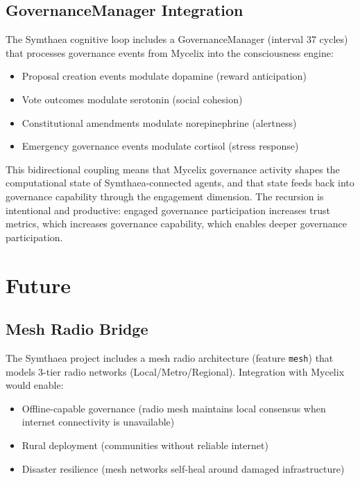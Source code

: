 \documentclass[12pt]{book}
\begin{document}
\section{GovernanceManager Integration}

The Symthaea cognitive loop includes a GovernanceManager (interval 37 cycles)
that processes governance events from Mycelix into the consciousness engine:

\begin{itemize}
  \item Proposal creation events modulate dopamine (reward anticipation)
  \item Vote outcomes modulate serotonin (social cohesion)
  \item Constitutional amendments modulate norepinephrine (alertness)
  \item Emergency governance events modulate cortisol (stress response)
\end{itemize}

This bidirectional coupling means that Mycelix governance activity shapes
the computational state of Symthaea-connected agents, and that state feeds
back into governance capability through the engagement dimension. The
recursion is intentional and productive: engaged governance participation
increases trust metrics, which increases governance capability, which
enables deeper governance participation.


\chapter{Future}

\section{Mesh Radio Bridge}

The Symthaea project includes a mesh radio architecture (feature \texttt{mesh})
that models 3-tier radio networks (Local/Metro/Regional). Integration with
Mycelix would enable:

\begin{itemize}
  \item Offline-capable governance (radio mesh maintains local consensus when
    internet connectivity is unavailable)
  \item Rural deployment (communities without reliable internet)
  \item Disaster resilience (mesh networks self-heal around damaged infrastructure)
\end{itemize}
\end{document}
